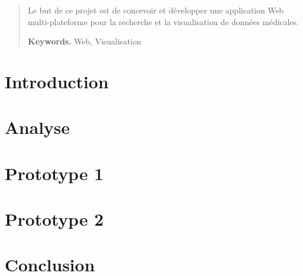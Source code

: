 






\def\myTitle{Développement d'une Application Web pour la Visualisation et la Recherche de Données Médicales}
\def\myName{Kewin Dousse}
\def\myUni{HES-SO}
\def\myDepartment{TIC}
\def\mySupervisors{Sandy Ingram}
\def\myExpert{?}


\begin{abstract}

Le but de ce projet est de concevoir et développer une application Web multi-plateforme pour la recherche et la visualisation de données médicales.

\smallskip
\noindent \textbf{Keywords.} Web, Visualisation

\end{abstract}
\setcounter{page}{3}
\hypersetup{pageanchor=true}

\tableofcontents
\listoffigures

\chapter{Introduction}

\chapter{Analyse}

\chapter{Prototype 1}

\chapter{Prototype 2}

\chapter{Conclusion}


